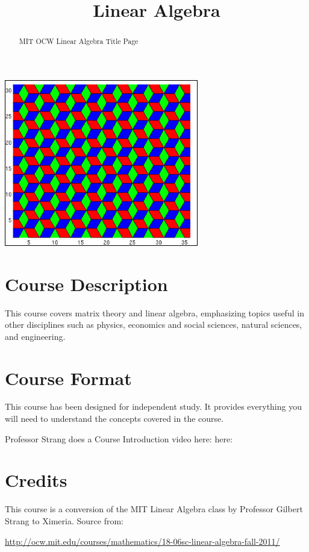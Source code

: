 \documentclass{ximera}
\title{Linear Algebra}
\begin{document}
\begin{abstract}
  MIT OCW Linear Algebra Title Page
\end{abstract}
\maketitle

\begin{image}
\includegraphics{Main.jpg}
\end{image}

\section*{Course Description}

This course covers matrix theory and linear algebra, emphasizing
topics useful in other disciplines such as physics, economics and
social sciences, natural sciences, and engineering.

\section*{Course Format}

This course has been designed for independent study. It provides
everything you will need to understand the concepts covered in the
course. 

Professor Strang does a Course Introduction video here:
here:


\section*{Credits}
This course is a conversion of the MIT Linear Algebra class by
Professor Gilbert Strang to Ximeria. Source from:


\url{http://ocw.mit.edu/courses/mathematics/18-06sc-linear-algebra-fall-2011/}
\end{document}
